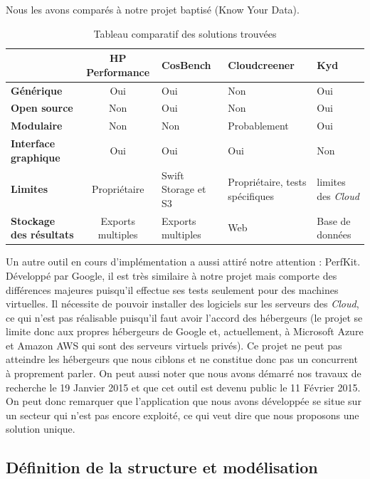 \documentclass[10pt]{article}
\begin{document}
Nous les avons comparés à notre projet baptisé \KYD (Know Your Data).


\begin{table}[h] \caption{Tableau comparatif des solutions trouvées}
\renewcommand{\arraystretch}{1.5} \begin{center}
\begin{tabular}{|p{2cm}|c|p{2cm}|p{3cm}|p{2cm}|} \hline & \bf HP Performance &
\bf CosBench & \bf Cloudcreener & \bf Kyd  \\ \hline \bf\centering Générique &
Oui & Oui & Non & Oui \\ \hline \bf\centering Open source & Non & Oui & Non &
Oui \\ \hline \bf\centering Modulaire & Non & Non & Probablement & Oui \\
\hline \bf\centering Interface graphique & Oui & Oui & Oui & Non \\ \hline
\bf\centering Limites & Propriétaire & Swift Storage et S3 & Propriétaire,
tests spécifiques & limites des \textit{Cloud} \\ \hline \bf\centering Stockage
des résultats & Exports multiples & Exports multiples & Web & Base de données
\\ \hline \end{tabular} \end{center} \end{table}

Un autre outil en cours d'implémentation a aussi attiré notre attention :
PerfKit. Développé par Google, il est très similaire à notre projet mais
comporte des différences majeures puisqu'il effectue ses tests seulement pour
des machines virtuelles. Il nécessite de pouvoir installer des logiciels sur
les serveurs des \textit{Cloud}, ce qui n'est pas réalisable puisqu'il faut
avoir l'accord des hébergeurs (le projet se limite donc aux propres hébergeurs
de Google et, actuellement, à Microsoft Azure et Amazon AWS qui sont des
serveurs virtuels privés). Ce projet ne peut pas atteindre les hébergeurs que
nous ciblons et ne constitue donc pas un concurrent à proprement parler. On
peut aussi noter que nous avons démarré nos travaux de recherche le 19 Janvier
2015 et que cet outil est devenu public le 11 Février 2015. On peut donc
remarquer que l’application que nous avons développée se situe sur un secteur
qui n’est pas encore exploité, ce qui veut dire que nous proposons une solution
unique.

\subsection{Définition de la structure et modélisation}
\end{document}
